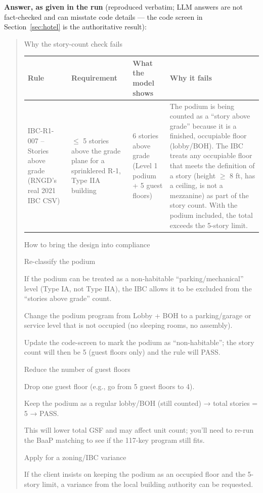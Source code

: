 \documentclass[10pt]{article}
\begin{document}
\textbf{Answer, as given in the run} (reproduced verbatim; LLM answers are not fact-checked and can misstate code details --- the code screen in Section~\ref{sec:hotel} is the authoritative result):\par
\begin{quote}Why the story-count check fails\par
{\footnotesize\begin{longtable}{p{3.75cm}p{3.75cm}p{3.75cm}p{3.75cm}}\toprule
\textbf{Rule} & \textbf{Requirement} & \textbf{What the model shows} & \textbf{Why it fails} \\ \midrule
IBC-R1-007 – Stories above grade (RNGD’s real 2021 IBC CSV) & $\le$ 5 stories above the grade plane for a sprinklered R-1, Type IIA building & 6 stories above grade (Level 1 podium + 5 guest floors) & The podium is being counted as a “story above grade” because it is a finished, occupiable floor (lobby/BOH). The IBC treats any occupiable floor that meets the definition of a story (height $\ge$ 8 ft, has a ceiling, is not a mezzanine) as part of the story count. With the podium included, the total exceeds the 5-story limit. \\
\bottomrule\end{longtable}}
How to bring the design into compliance\par
Re-classify the podium\par
If the podium can be treated as a non-habitable “parking/mechanical” level (Type IA, not Type IIA), the IBC allows it to be excluded from the “stories above grade” count.\par
Change the podium program from Lobby + BOH to a parking/garage or service level that is not occupied (no sleeping rooms, no assembly).\par
Update the code-screen to mark the podium as “non-habitable”; the story count will then be 5 (guest floors only) and the rule will PASS.\par
Reduce the number of guest floors\par
Drop one guest floor (e.g., go from 5 guest floors to 4).\par
Keep the podium as a regular lobby/BOH (still counted) → total stories = 5 → PASS.\par
This will lower total GSF and may affect unit count; you’ll need to re-run the BaaP matching to see if the 117-key program still fits.\par
Apply for a zoning/IBC variance\par
If the client insists on keeping the podium as an occupied floor and the 5-story limit, a variance from the local building authority can be requested.\par

\end{quote}
\end{document}

